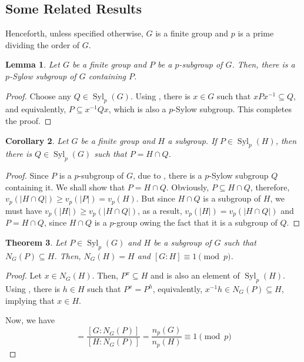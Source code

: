 \documentclass[12pt]{article}
\theoremstyle{thmstyle}
\newtheorem{theorem}{Theorem}[section]
\newtheorem{lemma}[theorem]{Lemma}
\theoremstyle{defstyle}
\newtheorem{corollary}[theorem]{Corollary}
\renewcommand{\ge}{\geqslant}
\newcommand{\Syl}{\operatorname{Syl}}
\begin{document}
\subsection{Some Related Results}

Henceforth, unless specified otherwise, $G$ is a finite group and $p$ is a prime dividing the order of $G$.

\begin{lemma}
    Let $G$ be a finite group and $P$ be a $p$-subgroup of $G$. Then, there is a $p$-Sylow subgroup of $G$ containing $P$.
\end{lemma}
\begin{proof}
    Choose any $Q\in\Syl_p(G)$. Using , there is $x\in G$ such that $xPx^{-1}\subseteq Q$, and equivalently, $P\subseteq x^{-1}Qx$, which is also a $p$-Sylow subgroup. This completes the proof.
\end{proof}

\begin{corollary}
    Let $G$ be a finite group and $H$ a subgroup. If $P\in\Syl_p(H)$, then there is $Q\in\Syl_p(G)$ such that $P = H\cap Q$.
\end{corollary}
\begin{proof}
    Since $P$ is a $p$-subgroup of $G$, due to , there is a $p$-Sylow subgroup $Q$ containing it. We shall show that $P = H\cap Q$. Obviously, $P\subseteq H\cap Q$, therefore, $v_p(|H\cap Q|)\ge v_p(|P|) = v_p(H)$. But since $H\cap Q$ is a subgroup of $H$, we must have $v_p(|H|)\ge v_p(|H\cap Q|)$, as a result, $v_p(|H|) = v_p(|H\cap Q|)$ and $P = H\cap Q$, since $H\cap Q$ is a $p$-group owing the fact that it is a subgroup of $Q$.
\end{proof}


\begin{theorem}
    Let $P\in\Syl_p(G)$ and $H$ be a subgroup of $G$ such that $N_G(P)\subseteq H$. Then, $N_G(H) = H$ and $[G:H]\equiv 1\pmod p$.
\end{theorem}
\begin{proof}
    Let $x\in N_G(H)$. Then, $P^x\subseteq H$ and is also an element of $\Syl_p(H)$. Using , there is $h\in H$ such that $P^x = P^h$, equivalently, $x^{-1}h\in N_G(P)\subseteq H$, implying that $x\in H$.

    Now, we have 
    \begin{equation*}
        [G:H] = \frac{[G:N_G(P)]}{[H:N_G(P)]} = \frac{n_p(G)}{n_p(H)}\equiv1\pmod p
    \end{equation*}
\end{proof}
\end{document}
